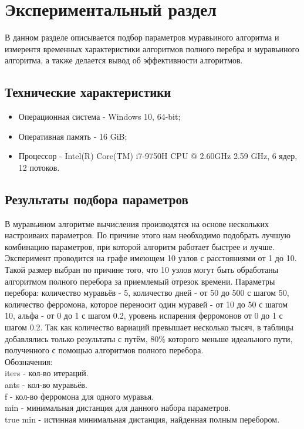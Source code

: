\chapter{Экспериментальный раздел}

В данном разделе описывается подбор параметров муравьиного алгоритма и измерентя временных характеристики алгоритмов полного перебра и муравьиного алгоритма, а также делается вывод об эффективности алгоритмов.

\section{Технические характеристики}
\begin{itemize}
	\item Операционная система - Windows 10, 64-bit;
	\item Оперативная память - 16 GiB;
	\item Процессор - Intel(R) Core(TM) i7-9750H CPU @ 2.60GHz 2.59 GHz, 6 ядер, 12 потоков.
\end{itemize}

\section{Результаты подбора параметров}

В муравьином алгоритме вычисления производятся на основе нескольких настроиваих параметров. По причине этого нам необходимо подобрать лучшую комбинацию параметров, при которой алгоритм работает быстрее и лучше. Эксперимент проводится на графе имеющем 10 узлов с расстояниями от 1 до 10. Такой размер выбран по причине того, что 10 узлов могут быть обработаны алгоритмом полного перебора за приемлемый отрезок времени. Параметры перебора: количество муравьёв - 5, количество дней - от 50 до 500 с шагом 50, количество ферромона, которое переносит один муравей - от 10 до 50 с шагом 10, альфа - от 0 до 1 с шагом 0.2, уровень испарения ферромонов от 0 до 1 с шагом 0.2. Так как количество вариаций превышает несколько тысяч, в таблицы добавлялись только результаты с путём, 80\% которого меньше идеального пути, полученного с помощью алгоритмов полного перебора.\\

\noindent Обозначения: \\
iters - кол-во итераций.\\
ants - кол-во муравьёв.\\
f - кол-во ферромона для одного муравья.\\
min - минимальная дистанция для данного набора параметров.\\
true min - истинная минимальная дистанция, найденная полным перебором.\\

